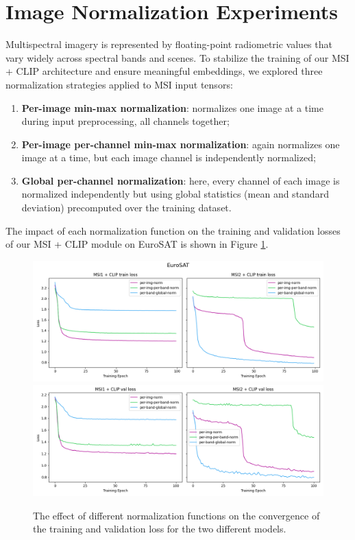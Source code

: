 \documentclass[a4paper, twoside, english]{sapthesis} %
\begin{document}
\section{Image Normalization Experiments}


Multispectral imagery is represented by floating-point radiometric values that vary widely across spectral bands and scenes. To stabilize the training of our MSI + CLIP architecture and ensure meaningful embeddings, we explored three normalization strategies applied to MSI input tensors:

\begin{enumerate}
    \item \textbf{Per-image min-max normalization}: normalizes one image at a time during input preprocessing, all channels together;
    \item \textbf{Per-image per-channel min-max normalization}: again normalizes one image at a time, but each image channel is independently normalized;
    \item \textbf{Global per-channel normalization}: here, every channel of each image is normalized independently but using global statistics (mean and standard deviation) precomputed over the training dataset.
\end{enumerate}

The impact of each normalization function on the training and validation losses of our MSI + CLIP module on EuroSAT is shown in Figure \ref{fig:normlosses}.

\begin{figure}[h]
    \centering
    \includegraphics[width=\textwidth]{img/EuroSAT_norm_train_losses_plot.png}
    \includegraphics[width=\textwidth]{img/EuroSAT_norm_val_losses_plot.png}
    \caption{\normalsize The effect of different normalization functions on the convergence of the training and validation loss for the two different models.}
    \label{fig:normlosses}
\end{figure}
\end{document}
